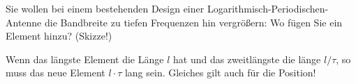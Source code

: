 \begin{question}[section=11,name={Logarithmisch Periodisch},difficulty=,quantity=,type=thr,tags={20131210,20130513}]
	Sie wollen bei einem bestehenden Design einer Logarithmisch-Periodischen-Antenne die Bandbreite zu tiefen Frequenzen hin vergrößern: Wo fügen Sie ein Element hinzu? (Skizze!)
	
	
\end{question}
\begin{solution}
	Wenn das längste Element die Länge $l$ hat und das zweitlängste die länge $l/\tau$, so muss das neue Element $l\cdot \tau$ lang sein. Gleiches gilt auch für die Position!
\end{solution}